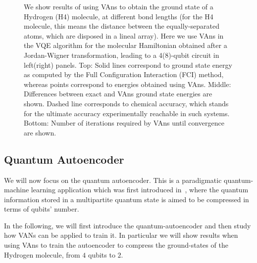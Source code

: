 \begin{figure}[b!]
\begin{subfigure}[b]{.49\textwidth}
      \caption{}
      \label{fig:h24}
  \end{subfigure}
\caption{We show results of using VAns to obtain the ground state of a Hydrogen (H4) molecule, at different bond lengths (for the H4 molecule, this means the distance between the equally-separated atoms, which are disposed in a lineal array). Here we use VAns in the VQE algorithm for the molecular Hamiltonian obtained after a Jordan-Wigner transformation, leading to a 4(8)-qubit circuit in left(right) panels. Top: Solid lines correspond to ground state energy as computed by the Full Configuration Interaction (FCI) method, whereas points correspond to energies obtained using VAns. Middle: Differences between exact and VAns ground state energies are shown. Dashed line corresponds to chemical accuracy, which stands for the ultimate accuracy experimentally reachable in such systems. Bottom: Number of iterations required by VAns until convergence are shown.}
\label{fig:H4}
\end{figure}

\clearpage

\subsection{Quantum Autoencoder}
We will now focus on the quantum autoencoder. This is a paradigmatic quantum-machine learning application which was first introduced in~\cite{romero2017quantum}, where the quantum information stored in a multipartite quantum state is aimed to be compressed in terms of qubits' number. %

In the following, we will first introduce the quantum-autoencoder and then study how VANs can be applied to train it. In particular we will show results when using VAns to train the autoencoder to compress the ground-states of the Hydrogen molecule, from $4$ qubits to $2$.

